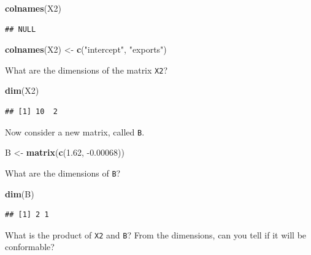 \documentclass[
]{book}
\newenvironment{Shaded}{\begin{snugshade}}{\end{snugshade}}
\newcommand{\FloatTok}[1]{\textcolor[rgb]{0.00,0.00,0.81}{#1}}
\newcommand{\KeywordTok}[1]{\textcolor[rgb]{0.13,0.29,0.53}{\textbf{#1}}}
\newcommand{\NormalTok}[1]{#1}
\newcommand{\StringTok}[1]{\textcolor[rgb]{0.31,0.60,0.02}{#1}}
\theoremstyle{definition}
\theoremstyle{definition}
\theoremstyle{definition}
\theoremstyle{remark}
\begin{document}
\begin{Shaded}
\begin{Highlighting}[]
\KeywordTok{colnames}\NormalTok{(X2)}
\end{Highlighting}
\end{Shaded}

\begin{verbatim}
## NULL
\end{verbatim}

\begin{Shaded}
\begin{Highlighting}[]
\KeywordTok{colnames}\NormalTok{(X2) <{-}}\StringTok{ }\KeywordTok{c}\NormalTok{(}\StringTok{"intercept"}\NormalTok{, }\StringTok{"exports"}\NormalTok{)}
\end{Highlighting}
\end{Shaded}

What are the dimensions of the matrix \texttt{X2}?

\begin{Shaded}
\begin{Highlighting}[]
\KeywordTok{dim}\NormalTok{(X2)}
\end{Highlighting}
\end{Shaded}

\begin{verbatim}
## [1] 10  2
\end{verbatim}

Now consider a new matrix, called \texttt{B}.

\begin{Shaded}
\begin{Highlighting}[]
\NormalTok{B <{-}}\StringTok{ }\KeywordTok{matrix}\NormalTok{(}\KeywordTok{c}\NormalTok{(}\FloatTok{1.62}\NormalTok{, }\FloatTok{{-}0.00068}\NormalTok{))}
\end{Highlighting}
\end{Shaded}

What are the dimensions of \texttt{B}?

\begin{Shaded}
\begin{Highlighting}[]
\KeywordTok{dim}\NormalTok{(B)}
\end{Highlighting}
\end{Shaded}

\begin{verbatim}
## [1] 2 1
\end{verbatim}

What is the product of \texttt{X2} and \texttt{B}? From the dimensions, can you tell if it will be conformable?
\end{document}
